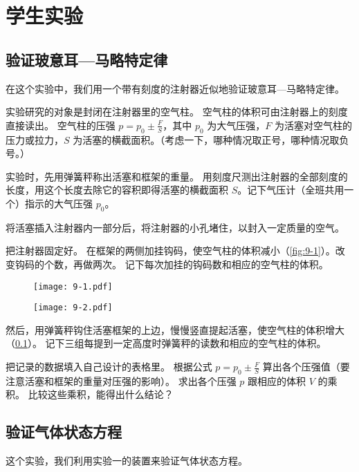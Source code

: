 \chapter*{学生实验}
\section{验证玻意耳—马略特定律}

在这个实验中，我们用一个带有刻度的注射器近似地验证玻意耳—马略特定律。

实验研究的对象是封闭在注射器里的空气柱。
空气柱的体积可由注射器上的刻度直接读出。
空气柱的压强 $p=p_0\pm \frac{F}{S}$，其中 $p_0$ 为大气压强，$F$ 为活塞对空气柱的压力或拉力，$S$ 为活塞的横截面积。（考虑一下，哪种情况取正号，哪种情况取负号。）

实验时，先用弹簧秤称出活塞和框架的重量。
用刻度尺测出注射器的全部刻度的长度，用这个长度去除它的容积即得活塞的横截面积 $S$。记下气压计（全班共用一个）指示的大气压强 $p_0$。

将活塞插入注射器内一部分后，将注射器的小孔堵住，以封入一定质量的空气。

把注射器固定好。
在框架的两侧加挂钩码，使空气柱的体积减小（\cref{fig:9-1}）。改变钩码的个数，再做两次。
记下每次加挂的钩码数和相应的空气柱的体积。
\begin{figure}
  \begin{minipage}[b]{0.48\linewidth}
  \centering
  \texttt{[image: 9-1.pdf]}
  \caption{}\label{fig:9-1}
  \end{minipage}
  \begin{minipage}[b]{0.48\linewidth}
  \centering
  \texttt{[image: 9-2.pdf]}
  \caption{}\label{fig:9-2}
  \end{minipage}
\end{figure}

然后，用弹簧秤钩住活塞框架的上边，慢慢竖直提起活塞，使空气柱的体积增大（\cref{fig:9-2}）。
记下三组每提到一定高度时弹簧秤的读数和相应的空气柱的体积。

把记录的数据填入自己设计的表格里。
根据公式 $p=p_0\pm \frac{F}{S}$ 算出各个压强值（要注意活塞和框架的重量对压强的影响）。
求出各个压强 $p$ 跟相应的体积 $V$ 的乘积。
比较这些乘积，能得出什么结论？

\section{验证气体状态方程}
这个实验，我们利用实验一的装置来验证气体状态方程。

